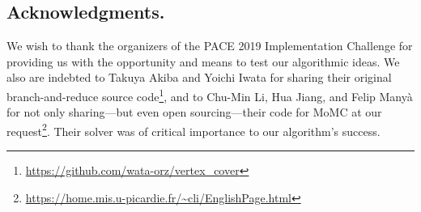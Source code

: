 \documentclass[twoside,leqno,twocolumn]{article}
\begin{document}
\subsection*{Acknowledgments.}
We wish to thank the organizers of the PACE 2019 Implementation Challenge for providing us with the opportunity and means to test our algorithmic ideas. We also are indebted to Takuya Akiba and  Yoichi Iwata for sharing their original branch-and-reduce source code\footnote{\url{https://github.com/wata-orz/vertex_cover}}, and to Chu-Min Li, Hua Jiang, and Felip Many\`a for not only sharing---but even open sourcing---their code for MoMC at our request\footnote{\url{https://home.mis.u-picardie.fr/~cli/EnglishPage.html}}. Their solver was of critical importance to our algorithm's success.

\end{document}
